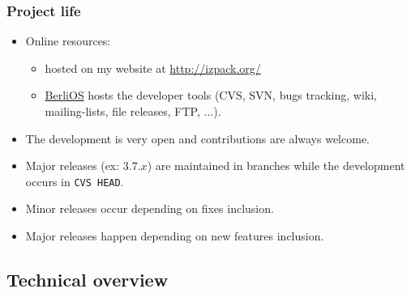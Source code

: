 \documentclass[compress,10pt]{beamer}
\begin{document}

\begin{frame}

\frametitle{Project life}

\begin{itemize}

  \item Online resources:
    \begin{itemize}
      \item hosted on my website at
      \href{http://izpack.org/}{\url{http://izpack.org/}}

      \item \href{http://www.berlios.de/}{BerliOS} hosts the developer tools
      (CVS, SVN, bugs tracking, wiki, mailing-lists, file releases, FTP, ...).
    \end{itemize}

    \item The development is very open and contributions are always welcome.

    \item Major releases (ex: $3.7.x$) are maintained in branches while the
    development occurs in \texttt{CVS HEAD}.

    \item Minor releases occur depending on fixes inclusion.

    \item Major releases happen depending on new features inclusion.

\end{itemize}

\end{frame}


\subsection{Technical overview}
\end{document}
